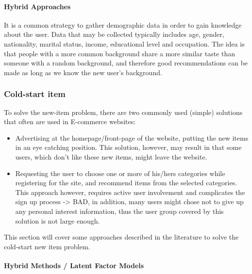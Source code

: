 \paragraph{Hybrid Approaches}

It is a common strategy to gather demographic data in order to gain knowledge about the user. Data that may be collected typically includes age, gender, nationality, marital status, income, educational level and occupation. The idea is that people with a more common background share a more similar taste than someone with a random background, and therefore good recommendations can be made as long as we know the new user’s background.



\subsubsection{Cold-start item}

To solve the new-item problem, there are two commonly used (simple) solutions that often are used in E-commerce websites:

\begin{itemize}
\item Advertising at the homepage/front-page of the website, putting the new items in an eye catching position. This solution, however, may 		result in that some users, which don't like these new items, might leave the website.
\item Requesting the user to choose one or more of his/hers categories while registering for the site, and recommend items from the selected categories. This approach however, requires active user involvement and complicates the sign up process -> BAD, in addition, many users might chose not to give up any personal interest information, thus the user group covered by this solution is not large enough.
\end{itemize}

This section will cover some approaches described in the literature to solve the cold-start new item problem.



\paragraph{Hybrid Methods / Latent Factor Models}

